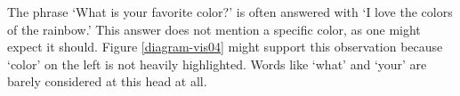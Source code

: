 The phrase `What is your favorite color?' is often answered with `I love the colors of the rainbow.' This answer does not mention a specific color, as one might expect it should. Figure \ref{diagram-vis04} might support this observation because `color' on the left is not heavily highlighted. Words like `what' and `your' are barely considered at this head at all. 

